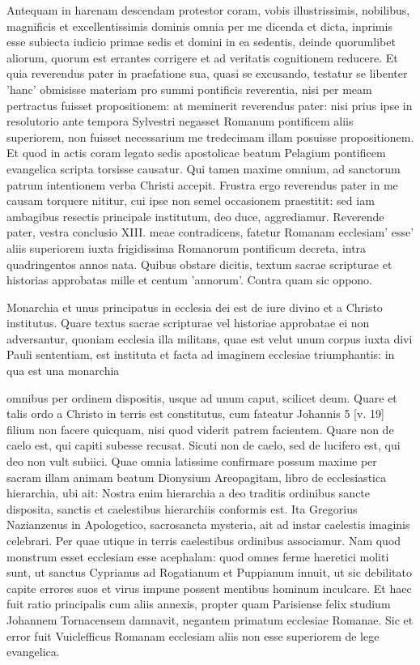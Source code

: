 Antequam in harenam descendam protestor coram, vobis illustrissimis, nobilibus, magnificis et excellentissimis dominis omnia per me dicenda et dicta, inprimis esse subiecta iudicio primae sedis et domini in ea sedentis, deinde quorumlibet aliorum, quorum est errantes corrigere et ad veritatis cognitionem reducere. Et quia reverendus pater in praefatione sua, quasi se excusando, testatur se libenter 'hanc' obmisisse materiam pro summi pontificis reverentia, nisi per meam pertractus fuisset propositionem: at meminerit reverendus pater: nisi prius ipse in resolutorio ante tempora Sylvestri negasset Romanum pontificem aliis superiorem, non fuisset necessarium me tredecimam illam posuisse propositionem. Et quod in actis coram legato sedis apostolicae beatum Pelagium pontificem evangelica scripta torsisse causatur. Qui tamen maxime omnium, ad sanctorum patrum intentionem verba Christi accepit. Frustra ergo reverendus pater in me causam torquere nititur, cui ipse non semel occasionem praestitit: sed iam ambagibus resectis principale institutum, deo duce, aggrediamur. Reverende pater, vestra conclusio XIII. meae contradicens, fatetur Romanam ecclesiam' esse' aliis superiorem iuxta frigidissima Romanorum pontificum decreta, intra quadringentos annos nata. Quibus obstare dicitis, textum sacrae scripturae et historias approbatas mille et centum 'annorum'. Contra quam sic oppono.

Monarchia et unus principatus in ecclesia dei est de iure divino et a Christo institutus. Quare textus sacrae scripturae vel historiae approbatae ei non adversantur, quoniam ecclesia illa militans, quae est velut unum corpus iuxta divi Pauli sententiam, est instituta et facta ad imaginem ecclesiae triumphantis: in qua est una monarchia

omnibus per ordinem dispositis, usque ad unum caput, scilicet deum. Quare et talis ordo a Christo in terris est constitutus, cum fateatur Johannis 5 [v. 19] filium non facere quicquam, nisi quod viderit patrem facientem. Quare non de caelo est, qui capiti subesse recusat. Sicuti non de caelo, sed de lucifero est, qui deo non vult subiici. Quae omnia latissime confirmare possum maxime per sacram illam animam beatum Dionysium Areopagitam, libro de ecclesiastica hierarchia, ubi ait: Nostra enim hierarchia a deo traditis ordinibus sancte disposita, sanctis \marginpar{\small[256]} et caelestibus hierarchiis conformis est. Ita Gregorius Nazianzenus in Apologetico, sacrosancta mysteria, ait ad instar caelestis imaginis celebrari. Per quae utique in terris caelestibus ordinibus associamur. Nam quod monstrum esset ecclesiam esse acephalam: quod omnes ferme haeretici moliti sunt, ut sanctus Cyprianus ad Rogatianum et Puppianum innuit, ut sic debilitato capite errores suos et virus impune possent mentibus hominum inculcare. Et haec fuit ratio principalis cum aliis annexis, propter quam Parisiense felix studium Johannem Tornacensem damnavit, negantem primatum ecclesiae Romanae. Sic et error fuit Vuiclefficus Romanam ecclesiam aliis non esse superiorem de lege evangelica.

